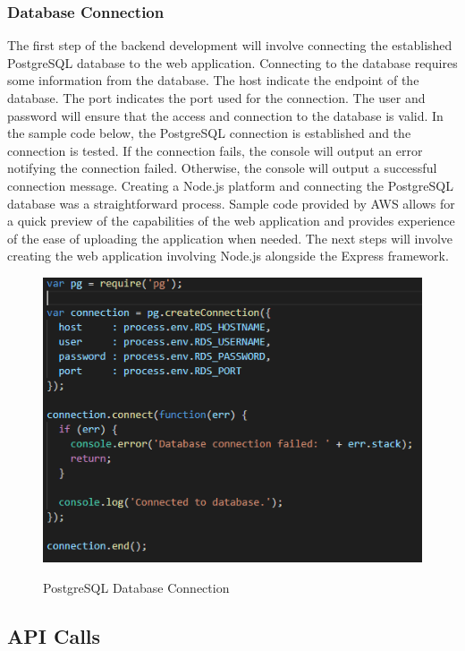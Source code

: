 \documentclass[12pt]{report}
\begin{document}
\subsubsection{Database Connection}

The first step of the backend development will involve connecting the established PostgreSQL database to the web application.  Connecting to the database requires some information from the database.  The host indicate the endpoint of the database.  The port indicates the port used for the connection.  The user and password will ensure that the access and connection to the database is valid.  In the sample code below, the PostgreSQL connection is established and the connection is tested.  If the connection fails, the console will output an error notifying the connection failed. Otherwise, the console will output a successful connection message.
Creating a Node.js platform and connecting the PostgreSQL database was a straightforward process.  Sample code provided by AWS allows for a quick preview of the capabilities of the web application and provides experience of the ease of uploading the application when needed.
The next steps will involve creating the web application involving Node.js alongside the Express framework.

\begin{figure}[h]
	\centering
	\caption{PostgreSQL Database Connection}
	\includegraphics[scale=0.5]{database_connection}
	\label{fig:javascripthttprequest}
\end{figure}

\subsection*{API Calls}
\end{document}

